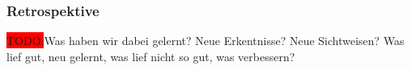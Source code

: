 \documentclass[10pt, a4paper]{article}
\begin{document}
\subsubsection{Retrospektive}
\colorbox{red}{TODO:}Was haben wir dabei gelernt? Neue Erkentnisse? Neue Sichtweisen?
Was lief gut, neu gelernt, was lief nicht so gut, was verbessern?

\end{document}
